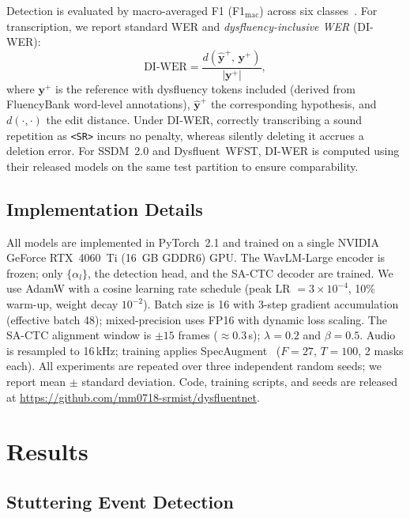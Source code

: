\documentclass[cameraready]{Interspeech}
\begin{document}
Detection is evaluated by macro-averaged F1 (F1$_\text{mac}$) across six
classes~\cite{sheikh2023advancing}. For transcription, we report standard WER
and \emph{dysfluency-inclusive WER} (DI-WER):
\begin{equation}
    \text{DI-WER} =
    \frac{d(\hat{\mathbf{y}}^+,\,\mathbf{y}^+)}{|\mathbf{y}^+|},
    \label{eq:diwer}
\end{equation}
where $\mathbf{y}^+$ is the reference with dysfluency tokens included (derived
from FluencyBank word-level annotations), $\hat{\mathbf{y}}^+$ the
corresponding hypothesis, and $d(\cdot,\cdot)$ the edit distance. Under
DI-WER, correctly transcribing a sound repetition as \texttt{<SR>} incurs no
penalty, whereas silently deleting it accrues a deletion error. For
SSDM~2.0 and Dysfluent~WFST, DI-WER is computed using their released models
on the same test partition to ensure comparability.

\subsection{Implementation Details}

All models are implemented in PyTorch~2.1 and trained on a single NVIDIA
GeForce RTX~4060~Ti (16~GB GDDR6) GPU. The WavLM-Large encoder is frozen;
only $\{\alpha_l\}$, the detection head, and the SA-CTC decoder are trained.
We use AdamW with a cosine learning rate schedule (peak LR $= 3 \times
10^{-4}$, 10\% warm-up, weight decay $10^{-2}$). Batch size is 16 with
3-step gradient accumulation (effective batch 48); mixed-precision uses FP16
with dynamic loss scaling. The SA-CTC alignment window is ${\pm}15$ frames
(${\approx}0.3$\,s); $\lambda=0.2$ and $\beta=0.5$. Audio is resampled to
16\,kHz; training applies SpecAugment~\cite{park2019specaugment} ($F=27$,
$T=100$, 2 masks each). All experiments are repeated over three independent
random seeds; we report mean $\pm$ standard deviation. Code, training
scripts, and seeds are released at
\url{https://github.com/mm0718-srmist/dysfluentnet}.

\section{Results}
\label{sec:results}

\subsection{Stuttering Event Detection}
\end{document}
